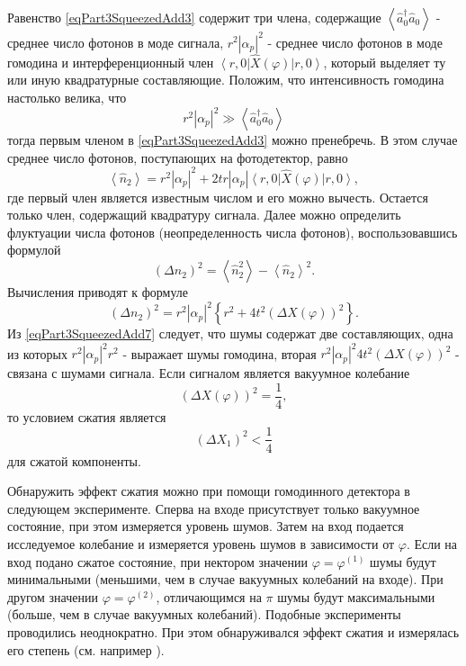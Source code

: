 Равенство \eqref{eqPart3SqueezedAdd3} содержит три члена, содержащие 
$\left<\hat{a}_0^{\dag}\hat{a}_0\right>$ - среднее число фотонов в моде
сигнала, $r^2\left|\alpha_p\right|^2$ - среднее число фотонов в моде
гомодина и интерференционный член 
$\left<r, 0\right|\hat{X}\left(\varphi\right)\left|r, 0\right>$,
который выделяет ту или иную квадратурные составляющие. Положим, что
интенсивность гомодина настолько велика, что 
\[
r^2 \left|\alpha_p\right|^2 \gg 
\left<\hat{a}_0^{\dag}\hat{a}_0\right>
\]
тогда первым членом в \eqref{eqPart3SqueezedAdd3} можно пренебречь. В
этом случае среднее число фотонов, поступающих на фотодетектор, равно
\begin{equation}
\left<\hat{n}_2\right> = 
r^2 \left|\alpha_p\right|^2 + 2 t r \left|\alpha_p\right|
\left<r, 0\right|\hat{X}\left(\varphi\right)\left|r, 0\right>,
\nonumber
\end{equation}
где первый член является известным числом и его можно
вычесть. Остается только член, содержащий квадратуру сигнала. Далее
можно определить флуктуации числа фотонов (неопределенность числа
фотонов), воспользовавшись формулой
\begin{equation}
\left(\Delta n_2\right)^2 = 
\left<\hat{n}_2^2\right>
-
\left<\hat{n}_2\right>^2.
\nonumber
\end{equation}
Вычисления приводят к формуле
\begin{equation}
\left(\Delta n_2\right)^2 =
r^2 \left|\alpha_p\right|^2
\left\{
r^2 + 4 t^2 
\left(
\Delta X \left(\varphi\right)
\right)^2
\right\}.
\label{eqPart3SqueezedAdd7}
\end{equation}
Из \eqref{eqPart3SqueezedAdd7} следует, что шумы содержат две
составляющих, одна из которых $r^2 \left|\alpha_p\right|^2 r^2$ -
выражает шумы гомодина, вторая 
$r^2 \left|\alpha_p\right|^2 4 t^2 
\left(
\Delta X \left(\varphi\right)
\right)^2$ -  связана с шумами сигнала. Если сигналом является вакуумное
колебание 
\[
\left(\Delta X \left(\varphi\right)\right)^2  = \frac{1}{4},
\] 
то условием сжатия является 
\[
\left(\Delta X_1 \right)^2 < \frac{1}{4}
\]
для сжатой компоненты. 

Обнаружить эффект сжатия можно при помощи
гомодинного детектора в следующем эксперименте. Сперва на входе
присутствует только вакуумное состояние, при этом измеряется уровень
шумов. Затем на вход подается исследуемое колебание и измеряется
уровень шумов в зависимости от $\varphi$. Если на вход подано сжатое
состояние, при нектором значении $\varphi = \varphi^{(1)}$ шумы будут
минимальными (меньшими, чем в случае вакуумных колебаний на входе). При
другом значении $\varphi = \varphi^{(2)}$, отличающимся на $\pi$ шумы
будут максимальными (больше, чем в случае вакуумных
колебаний). Подобные эксперименты проводились неоднократно. При этом
обнаруживался эффект сжатия и измерялась его степень (см. например
\cite{bNonclassSqueezedStateDetection}). 


